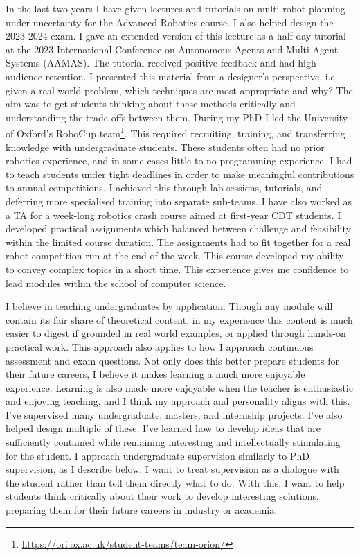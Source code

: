 \documentclass[12pt]{article}
\begin{document}
In the last two years I have given lectures and tutorials on multi-robot planning under uncertainty for the Advanced Robotics course.
%
I also helped design the 2023-2024 exam.
%
I gave an extended version of this lecture as a half-day tutorial at the 2023 International Conference on Autonomous Agents and Multi-Agent Systems (AAMAS).
%
The tutorial received positive feedback and had high audience retention.
%
I presented this material from a designer's perspective, i.e. given a real-world problem, which techniques are most appropriate and why?
%
The aim was to get students thinking about these methods critically and understanding the trade-offs between them.
%
During my PhD I led the University of Oxford's RoboCup team\footnote{\url{https://ori.ox.ac.uk/student-teams/team-orion/}}.
%
This required recruiting, training, and transferring knowledge with undergraduate students.
%
These students often had no prior robotics experience, and in some cases little to no programming experience.
%
I had to teach students under tight deadlines in order to make meaningful contributions to annual competitions. 
%
I achieved this through lab sessions, tutorials, and deferring more specialised training into separate sub-teams.
%
%
I have also worked as a TA for a week-long robotics crash course aimed at first-year CDT students.
%
I developed practical assignments which balanced between challenge and feasibility within the limited course duration.
%
The assignments had to fit together for a real robot competition run at the end of the week.
%
This course developed my ability to convey complex topics in a short time.
%
This experience gives me confidence to lead modules within the school of computer science.

I believe in teaching undergraduates by application.
%
Though any module will contain its fair share of theoretical content, in my experience this content is much easier to digest if grounded in real world examples, or applied through hands-on practical work.
%
This approach also applies to how I approach continuous assessment and exam questions.
%
Not only does this better prepare students for their future careers, I believe it makes learning a much more enjoyable experience.
%
Learning is also made more enjoyable when the teacher is enthusiastic and enjoying teaching, and I think my approach and personality aligns with this.
%
I've supervised many undergraduate, masters, and internship projects.
%
I've also helped design multiple of these.
%
I've learned how to develop ideas that are sufficiently contained while remaining interesting and intellectually stimulating for the student.
%
I approach undergraduate supervision similarly to PhD supervision, as I describe below.
%
I want to treat supervision as a dialogue with the student rather than tell them directly what to do.
%
With this, I want to help students think critically about their work to develop interesting solutions, preparing them for their future careers in industry or academia.
\end{document}
